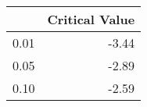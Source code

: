 \begin{tabular}{lr}
\toprule
{} &  Critical Value \\
\midrule
0.01 &           -3.44 \\
0.05 &           -2.89 \\
0.10 &           -2.59 \\
\bottomrule
\end{tabular}
